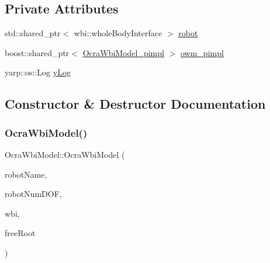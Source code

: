 \subsection*{Private Attributes}
\begin{DoxyCompactItemize}
\item 
std\+::shared\+\_\+ptr$<$ wbi\+::whole\+Body\+Interface $>$ \hyperlink{classocra__icub_1_1OcraWbiModel_ae377f000580656227fa9ef69f2f2e71d}{robot}
\item 
boost\+::shared\+\_\+ptr$<$ \hyperlink{structOcraWbiModel_1_1OcraWbiModel__pimpl}{Ocra\+Wbi\+Model\+\_\+pimpl} $>$ \hyperlink{classocra__icub_1_1OcraWbiModel_ab649cb769ca4edd345b3c09c43a69bde}{owm\+\_\+pimpl}
\item 
yarp\+::os\+::\+Log \hyperlink{classocra__icub_1_1OcraWbiModel_a047fe9f9a96794af218ea844f09cd402}{y\+Log}
\end{DoxyCompactItemize}


\subsection{Constructor \& Destructor Documentation}
\hypertarget{classocra__icub_1_1OcraWbiModel_a57a4f0f140f56d7ec0a00b31e16f9673}{}\label{classocra__icub_1_1OcraWbiModel_a57a4f0f140f56d7ec0a00b31e16f9673} 
\subsubsection{\texorpdfstring{Ocra\+Wbi\+Model()}{OcraWbiModel()}}
{\footnotesize\ttfamily Ocra\+Wbi\+Model\+::\+Ocra\+Wbi\+Model (\begin{DoxyParamCaption}\item[{const std\+::string \&}]{robot\+Name,  }\item[{const int}]{robot\+Num\+D\+OF,  }\item[{std\+::shared\+\_\+ptr$<$ wbi\+::whole\+Body\+Interface $>$}]{wbi,  }\item[{const bool}]{free\+Root }\end{DoxyParamCaption})}

\hypertarget{classocra__icub_1_1OcraWbiModel_ade110b2e003ccd49d2baa4f56a954e4b}{}\label{classocra__icub_1_1OcraWbiModel_ade110b2e003ccd49d2baa4f56a954e4b} 
